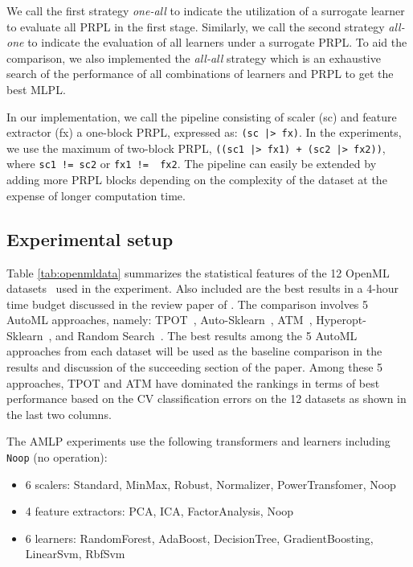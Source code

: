\documentclass{juliacon}
\begin{document}
We call the first strategy \emph{one-all} to indicate the utilization of a
surrogate learner to evaluate all PRPL in the first stage.
Similarly, we call the second strategy \emph{all-one}
to indicate the evaluation of all learners under a
surrogate PRPL.  To aid the comparison, we also implemented the
\emph{all-all} strategy which is an exhaustive search of the performance of all
combinations of learners and PRPL to get the best MLPL.

\vskip 6pt

In our implementation, we call the pipeline consisting of scaler (sc) and
feature extractor (fx) a one-block PRPL, expressed as: \texttt{(sc~|>~fx)}.
In the experiments, we use the maximum of two-block PRPL,
\texttt{((sc1~|>~fx1)~+~(sc2~|>~fx2))}, where \texttt{sc1~!=~sc2} or
\texttt{fx1~!=~ fx2}.  The pipeline can easily be extended by adding more PRPL
blocks depending on the complexity of the dataset at the expense of longer
computation time.

\subsection{Experimental setup}



Table \ref{tab:openmldata} summarizes the statistical features of the 12 OpenML
datasets~\cite{openml} used in the experiment.  Also included are the best
results in a 4-hour time budget  discussed in the review paper
of \cite{zoller2019}.  The comparison involves 5 AutoML approaches, namely:
TPOT~\cite{tpot2016}, Auto-Sklearn~\cite{Feurer:AML2019Chp6,Feurer:NIPS2015},
ATM~\cite{atm2017}, Hyperopt-Sklearn~\cite{bergstra2011nips,bergstra2012}, and
Random Search~\cite{anderson1953}.  The best results among the 5 AutoML approaches
from each dataset  will be used as the baseline comparison in the results and discussion 
of the succeeding section of the paper. Among these 5 approaches, TPOT and ATM have
dominated the rankings in terms of best performance based on the
CV classification errors on the 12 datasets as shown in the last two columns.

\vskip 6pt

The AMLP experiments use the following transformers and learners including
\texttt{Noop} (no operation):
\begin{itemize}
  \item 6 scalers: Standard, MinMax, Robust, Normalizer, PowerTransfomer, Noop
  \item 4 feature extractors: PCA, ICA, FactorAnalysis, Noop
  \item 6 learners: RandomForest, AdaBoost, DecisionTree, GradientBoosting, LinearSvm, RbfSvm
\end{itemize}
\end{document}
